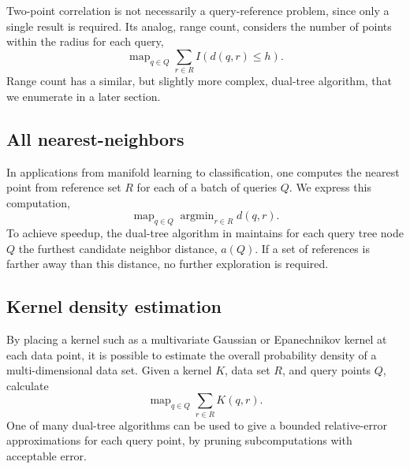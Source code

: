 \documentclass[twoside,leqno,twocolumn]{article}
\DeclareMathOperator*{\map}{map}
\DeclareMathOperator*{\argmin}{argmin}
\newcommand{\mysub}[1]{\subsection{#1} }
\begin{document}
Two-point correlation is not necessarily a query-reference problem, since only a single result is required.
Its analog, range count, considers the number of points within the radius for each query,
\[\map_{q \in Q} \sum_{r \in R} I(d(q, r) \leq h).\]
Range count has a similar, but slightly more complex, dual-tree algorithm, that we enumerate in a later section.

\mysub{All nearest-neighbors}
In applications from manifold learning to classification, one computes the nearest point from reference set $R$ for each of a batch of queries $Q$.
We express this computation,
\[\map_{q \in Q} \argmin_{r \in R} d(q,r).\]
\noindent To achieve speedup, the dual-tree algorithm in \cite{ryan_nips} maintains for each query tree node $Q$ the furthest candidate neighbor distance, $a(Q)$.
If a set of references is farther away than this distance, no further exploration is required.

\mysub{Kernel density estimation}
By placing a kernel such as a multivariate Gaussian or Epanechnikov kernel at each data point, it is possible to estimate the overall probability density of a multi-dimensional data set.
Given a kernel $K$, data set $R$, and query points $Q$, calculate
\[\map_{q \in Q} \sum_{r \in R} K(q, r).\]
One of many dual-tree algorithms \cite{gray_kde, lee_gauss1, lee_gauss2} can be used to give a bounded relative-error approximations for each query point, by pruning subcomputations with acceptable error.

\end{document}
